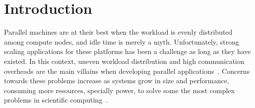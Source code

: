 \section{Introduction}


%
%
%
%
%
%
%
%
%

Parallel machines are at their best when the workload is evenly distributed among compute nodes, and idle time is merely a myth.
Unfortunately, strong scaling applications for these platforms has been a challenge as long as they have existed.
In this context, uneven workload distribution and high communication overheads are the main villains when developing parallel applications~\cite{Deveci2015, commaware}.
Concerns towards these problems increase as systems grow in size and performance, consuming more resources, specially power, to solve some the most complex problems in scientific computing~\cite{exapower2015,padoin2017energy}.


